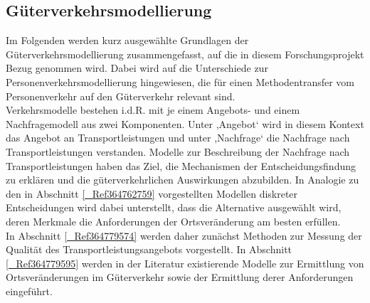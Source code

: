 \subsection{Güterverkehrsmodellierung}
\label{_Ref364763022}
\label{_Toc365801593}
\label{_Toc366766083}
\label{_Toc366775277}
\label{_Ref363485580}
\label{_Toc363572022}
Im Folgenden werden kurz ausgewählte Grundlagen der Güterverkehrsmodellierung zusammengefasst, auf die in diesem Forschungsprojekt Bezug genommen wird. Dabei wird auf die Unterschiede zur Personenverkehrsmodellierung hingewiesen, die für einen Methodentransfer vom Personenverkehr auf den Güterverkehr relevant sind.~\\
Verkehrsmodelle bestehen i.d.R. mit je einem Angebots- und einem Nachfragemodell aus zwei Komponenten. Unter ,Angebot‘ wird in diesem Kontext das Angebot an Transportleistungen und unter ,Nachfrage‘ die Nachfrage nach Transportleistungen verstanden. Modelle zur Beschreibung der Nachfrage nach Transportleistungen haben das Ziel, die Mechanismen der Entscheidungsfindung zu erklären und die güterverkehrlichen Auswirkungen abzubilden. In Analogie zu den in Abschnitt \autoref{_Ref364762759}  vorgestellten Modellen diskreter Entscheidungen wird dabei unterstellt, dass die Alternative ausgewählt wird, deren Merkmale die Anforderungen der Ortsveränderung am besten erfüllen.~\\
In Abschnitt \autoref{_Ref364779574}  werden daher zunächst Methoden zur Messung der Qualität des Transportleistungsangebots vorgestellt. In Abschnitt \autoref{_Ref364779595}  werden in der Literatur existierende Modelle zur Ermittlung von Ortsveränderungen im Güterverkehr sowie der Ermittlung derer Anforderungen eingeführt.~\\


% 
